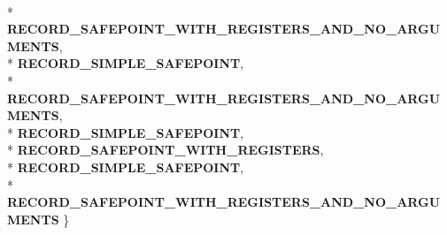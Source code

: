 \begin{DoxyCompactItemize}
\\*
{\bfseries R\+E\+C\+O\+R\+D\+\_\+\+S\+A\+F\+E\+P\+O\+I\+N\+T\+\_\+\+W\+I\+T\+H\+\_\+\+R\+E\+G\+I\+S\+T\+E\+R\+S\+\_\+\+A\+N\+D\+\_\+\+N\+O\+\_\+\+A\+R\+G\+U\+M\+E\+N\+TS}, 
\\*
{\bfseries R\+E\+C\+O\+R\+D\+\_\+\+S\+I\+M\+P\+L\+E\+\_\+\+S\+A\+F\+E\+P\+O\+I\+NT}, 
\\*
{\bfseries R\+E\+C\+O\+R\+D\+\_\+\+S\+A\+F\+E\+P\+O\+I\+N\+T\+\_\+\+W\+I\+T\+H\+\_\+\+R\+E\+G\+I\+S\+T\+E\+R\+S\+\_\+\+A\+N\+D\+\_\+\+N\+O\+\_\+\+A\+R\+G\+U\+M\+E\+N\+TS}, 
\\*
{\bfseries R\+E\+C\+O\+R\+D\+\_\+\+S\+I\+M\+P\+L\+E\+\_\+\+S\+A\+F\+E\+P\+O\+I\+NT}, 
\\*
{\bfseries R\+E\+C\+O\+R\+D\+\_\+\+S\+A\+F\+E\+P\+O\+I\+N\+T\+\_\+\+W\+I\+T\+H\+\_\+\+R\+E\+G\+I\+S\+T\+E\+RS}, 
\\*
{\bfseries R\+E\+C\+O\+R\+D\+\_\+\+S\+I\+M\+P\+L\+E\+\_\+\+S\+A\+F\+E\+P\+O\+I\+NT}, 
\\*
{\bfseries R\+E\+C\+O\+R\+D\+\_\+\+S\+A\+F\+E\+P\+O\+I\+N\+T\+\_\+\+W\+I\+T\+H\+\_\+\+R\+E\+G\+I\+S\+T\+E\+R\+S\+\_\+\+A\+N\+D\+\_\+\+N\+O\+\_\+\+A\+R\+G\+U\+M\+E\+N\+TS}
 \}\hypertarget{classv8_1_1internal_1_1_l_code_gen_a166a08e2444941f7aec4c9748db666d0}{}\label{classv8_1_1internal_1_1_l_code_gen_a166a08e2444941f7aec4c9748db666d0}


\end{DoxyCompactItemize}
